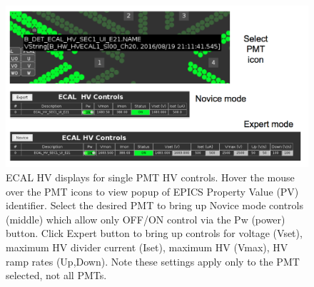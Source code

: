 \documentclass[letterpaper,10pt]{article}
\begin{document}
\begin{figure}[htbp]
  \centering
  \includegraphics[width= 6in, keepaspectratio = true]{expert-novice}
  \vspace{2mm}
  \caption{ECAL HV displays for single PMT HV controls.  Hover the mouse over the PMT icons to
    view popup of EPICS Property Value (PV) identifier. Select the desired PMT to bring up Novice
    mode controls (middle) which allow only OFF/ON control via the Pw (power) button.  Click Expert button to
    bring up controls for voltage (Vset), maximum HV divider current (Iset), maximum HV (Vmax), HV ramp
  rates (Up,Down). Note these settings apply only to the PMT selected, not all PMTs.}
  \label{ecal-screen3}
\end{figure}
\end{document}
